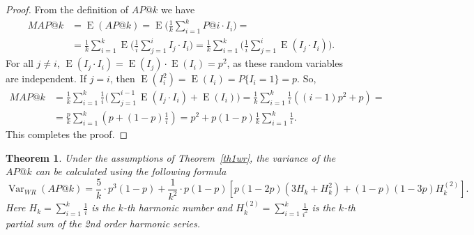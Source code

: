 \documentclass{tpms-l}
\newtheorem{theorem}{Theorem}[section]
\theoremstyle{definition}
\theoremstyle{remark}
\numberwithin{equation}{section}
\begin{document}
\begin{proof}

From the definition of $AP@k$ we have
\begin{equation*}
\begin{split}
MAP@k & =   \operatorname{E} (AP@k) = \operatorname{E}\bigg(\frac 1k \sum_{i=1}^k P@i\cdot I_{i}\bigg)= \\
&=\frac 1k \sum_{i=1}^k \operatorname{E}\bigg(\frac{1}{i}\sum_{j=1}^iI_j\cdot I_{i}\bigg)= \frac 1k \sum_{i=1}^k \bigg(\frac{1}{i}\sum_{j=1}^i\operatorname{E}( I_j\cdot I_{i})\bigg). 
\end{split}
\end{equation*}
For all $j\neq i$, $\operatorname{E}( I_j\cdot I_{i})= \operatorname{E}( I_j)\cdot \operatorname{E}(I_{i})=p^2$, as these random variables are  independent. If $j=i$, then  $\operatorname{E}(I_{i}^2)= \operatorname{E}(I_{i})=P\{I_i=1\}=p$. 
So, 
\begin{equation*}
\begin{split}
MAP@k&=\frac 1k \sum_{i=1}^k \frac{1}{i}\bigg(\sum_{j=1}^{i-1}\operatorname{E}( I_j\cdot I_{i})+\operatorname{E}(I_i)\bigg)=\frac 1k \sum_{i=1}^k \frac{1}{i}((i-1)p^2+p)=\\
&=\frac pk  \sum_{i=1}^k (p+(1-p)\frac 1i)= p^2+p(1-p)\frac 1k \sum_{i=1}^k \frac{1}{i}.
\end{split}
\end{equation*}
This completes the proof. 
\end{proof}


\begin{theorem}\label{th2wr}
    Under the assumptions of Theorem~\ref{th1wr}, the variance of the $AP@k$ can be calculated using the following formula
$$
\operatorname{Var}_{WR}(AP@k) = \frac{5}{k} \cdot p^3 (1-p) + \frac{1}{k^2} \cdot p(1-p) \left[p(1-2 p)(3 H_k + H_k^2) + (1-p)(1-3 p)H_k^{\left(2\right)} \right].
$$
Here $H_k=\sum_{i=1}^k\frac1i$ is the $k$-th harmonic number and $H_k^{\left(2\right)}=\sum_{i=1}^k\frac{1}{i^2}$ is the $k$-th partial sum of the 2nd order harmonic series.
\end{theorem}
\end{document}
